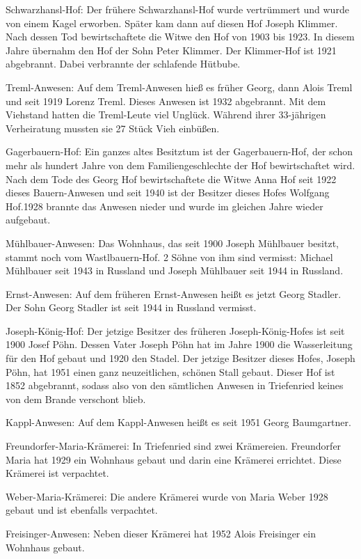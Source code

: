 \documentclass[12pt,a4pager]{book}
\begin{document}
Schwarzhansl-Hof: Der frühere Schwarzhansl-Hof wurde vertrümmert und wurde von
einem Kagel erworben. Später kam dann auf diesen Hof Joseph Klimmer. Nach dessen
Tod bewirtschaftete die Witwe den Hof von 1903 bis 1923. In diesem Jahre
übernahm den Hof der Sohn Peter Klimmer. Der Klimmer-Hof ist 1921 abgebrannt.
Dabei verbrannte der schlafende Hütbube.

Treml-Anwesen: Auf dem Treml-Anwesen hieß es früher Georg, dann Alois Treml und
seit 1919 Lorenz Treml. Dieses Anwesen ist 1932 abgebrannt. Mit dem Viehstand
hatten die Treml-Leute viel Unglück. Während ihrer 33-jährigen Verheiratung
mussten sie 27 Stück Vieh einbüßen.

Gagerbauern-Hof: Ein ganzes altes Besitztum ist der Gagerbauern-Hof, der schon
mehr als hundert Jahre von dem Familiengeschlechte der Hof bewirtschaftet wird.
Nach dem Tode des Georg Hof bewirtschaftete die Witwe Anna Hof seit 1922 dieses
Bauern-Anwesen und seit 1940 ist der Besitzer dieses Hofes Wolfgang Hof.1928
brannte das Anwesen nieder und wurde im gleichen Jahre wieder aufgebaut.

Mühlbauer-Anwesen: Das Wohnhaus, das seit 1900 Joseph Mühlbauer besitzt, stammt
noch vom Wastlbauern-Hof. 2 Söhne von ihm sind vermisst: Michael Mühlbauer seit
1943 in Russland und Joseph Mühlbauer seit 1944 in Russland.

Ernst-Anwesen: Auf dem früheren Ernst-Anwesen heißt es jetzt Georg Stadler. Der
Sohn Georg Stadler ist seit 1944 in Russland vermisst.

Joseph-König-Hof: Der jetzige Besitzer des früheren Joseph-König-Hofes ist seit
1900 Josef Pöhn. Dessen Vater Joseph Pöhn hat im Jahre 1900 die Wasserleitung
für den Hof gebaut und 1920 den Stadel. Der jetzige Besitzer dieses Hofes,
Joseph Pöhn, hat 1951 einen ganz neuzeitlichen, schönen Stall gebaut. Dieser Hof
ist 1852 abgebrannt, sodass also von den sämtlichen Anwesen in Triefenried
keines von dem Brande verschont blieb.

Kappl-Anwesen: Auf dem Kappl-Anwesen heißt es seit 1951 Georg Baumgartner.

Freundorfer-Maria-Krämerei: In Triefenried sind zwei Krämereien. Freundorfer
Maria hat 1929 ein Wohnhaus gebaut und darin eine Krämerei errichtet. Diese
Krämerei ist verpachtet.

Weber-Maria-Krämerei: Die andere Krämerei wurde von Maria Weber 1928 gebaut und
ist ebenfalls verpachtet.

Freisinger-Anwesen: Neben dieser Krämerei hat 1952 Alois Freisinger ein Wohnhaus
gebaut.
\end{document}
